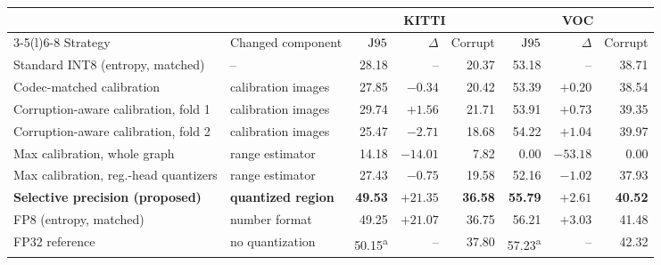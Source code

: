 \begin{tabular}{@{}llrrrrrr@{}}
\toprule
 & & \multicolumn{3}{c}{KITTI} & \multicolumn{3}{c}{VOC} \\
\cmidrule(lr){3-5}\cmidrule(l){6-8}
Strategy & Changed component & $\mathrm{J95}$ & $\Delta$ & Corrupt & $\mathrm{J95}$ & $\Delta$ & Corrupt \\
\midrule
Standard INT8 (entropy, matched) & -- & 28.18 & -- & 20.37 & 53.18 & -- & 38.71 \\
Codec-matched calibration & calibration images & 27.85 & $-0.34$ & 20.42 & 53.39 & $+0.20$ & 38.54 \\
Corruption-aware calibration, fold 1 & calibration images & 29.74 & $+1.56$ & 21.71 & 53.91 & $+0.73$ & 39.35 \\
Corruption-aware calibration, fold 2 & calibration images & 25.47 & $-2.71$ & 18.68 & 54.22 & $+1.04$ & 39.97 \\
Max calibration, whole graph & range estimator & 14.18 & $-14.01$ & 7.82 & 0.00 & $-53.18$ & 0.00 \\
Max calibration, reg.-head quantizers & range estimator & 27.43 & $-0.75$ & 19.58 & 52.16 & $-1.02$ & 37.93 \\
\addlinespace[2pt]
\textbf{Selective precision (proposed)} & \textbf{quantized region} & \textbf{49.53} & \textbf{$+21.35$} & \textbf{36.58} & \textbf{55.79} & \textbf{$+2.61$} & \textbf{40.52} \\
\addlinespace[2pt]
FP8 (entropy, matched) & number format & 49.25 & $+21.07$ & 36.75 & 56.21 & $+3.03$ & 41.48 \\
FP32 reference & no quantization & 50.15\textsuperscript{a} & -- & 37.80 & 57.23\textsuperscript{a} & -- & 42.32 \\
\bottomrule
\end{tabular}
